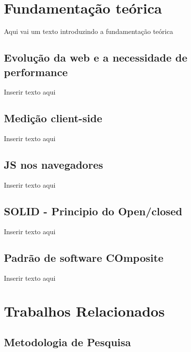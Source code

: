 \documentclass[12pt]{tcc}
\begin{document}
\chapter{Fundamentação teórica}
\label{cap:fundamentacao_teorica}
Aqui vai um texto introduzindo a fundamentação teórica

	\section{Evolução da web e a necessidade de performance}
	\label{cap:medicao-client-side}
	Inserir texto aqui

	\section{Medição client-side}
	\label{cap:medicao-client-side}
	Inserir texto aqui

	\section{JS nos navegadores}
	\label{cap:typescript}
	Inserir texto aqui

	\section{SOLID - Principio do Open/closed}
	\label{cap:typescript}
	Inserir texto aqui

	\section{Padrão de software COmposite}
	\label{cap:typescript}
	Inserir texto aqui



\chapter{Trabalhos Relacionados}
\label{sec:trabalhos_relacionados}
	\label{sec:trab_relacionados}


	\section{Metodologia de Pesquisa}
	\label{cap:met_pesquisa}
\end{document}
